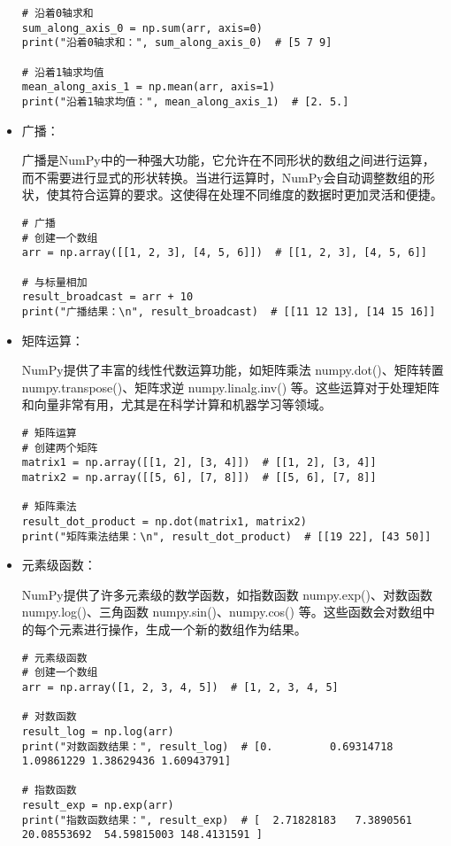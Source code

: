 \documentclass{article}
\begin{document}
\begin{itemize}
\begin{lstlisting}[caption={示例Python代码}]
# 沿着0轴求和
sum_along_axis_0 = np.sum(arr, axis=0)
print("沿着0轴求和：", sum_along_axis_0)  # [5 7 9]

# 沿着1轴求均值
mean_along_axis_1 = np.mean(arr, axis=1)
print("沿着1轴求均值：", mean_along_axis_1)  # [2. 5.]
\end{lstlisting}
    
 
 \item 广播：

 广播是NumPy中的一种强大功能，它允许在不同形状的数组之间进行运算，而不需要进行显式的形状转换。当进行运算时，NumPy会自动调整数组的形状，使其符合运算的要求。这使得在处理不同维度的数据时更加灵活和便捷。
\begin{lstlisting}[caption={示例Python代码}]
# 广播
# 创建一个数组
arr = np.array([[1, 2, 3], [4, 5, 6]])  # [[1, 2, 3], [4, 5, 6]]

# 与标量相加
result_broadcast = arr + 10
print("广播结果：\n", result_broadcast)  # [[11 12 13], [14 15 16]]
\end{lstlisting}
\item 矩阵运算：

 NumPy提供了丰富的线性代数运算功能，如矩阵乘法 numpy.dot()、矩阵转置 numpy.transpose()、矩阵求逆 numpy.linalg.inv() 等。这些运算对于处理矩阵和向量非常有用，尤其是在科学计算和机器学习等领域。
 \begin{lstlisting}[caption={示例Python代码}]
 # 矩阵运算
# 创建两个矩阵
matrix1 = np.array([[1, 2], [3, 4]])  # [[1, 2], [3, 4]]
matrix2 = np.array([[5, 6], [7, 8]])  # [[5, 6], [7, 8]]

# 矩阵乘法
result_dot_product = np.dot(matrix1, matrix2)
print("矩阵乘法结果：\n", result_dot_product)  # [[19 22], [43 50]]
\end{lstlisting}
\item 元素级函数：

 NumPy提供了许多元素级的数学函数，如指数函数 numpy.exp()、对数函数 numpy.log()、三角函数 numpy.sin()、numpy.cos() 等。这些函数会对数组中的每个元素进行操作，生成一个新的数组作为结果。
 \begin{lstlisting}[caption={示例Python代码}]
 # 元素级函数
# 创建一个数组
arr = np.array([1, 2, 3, 4, 5])  # [1, 2, 3, 4, 5]

# 对数函数
result_log = np.log(arr)
print("对数函数结果：", result_log)  # [0.         0.69314718 1.09861229 1.38629436 1.60943791]

# 指数函数
result_exp = np.exp(arr)
print("指数函数结果：", result_exp)  # [  2.71828183   7.3890561   20.08553692  54.59815003 148.4131591 ]


\end{lstlisting}
\end{itemize}
\end{document}
